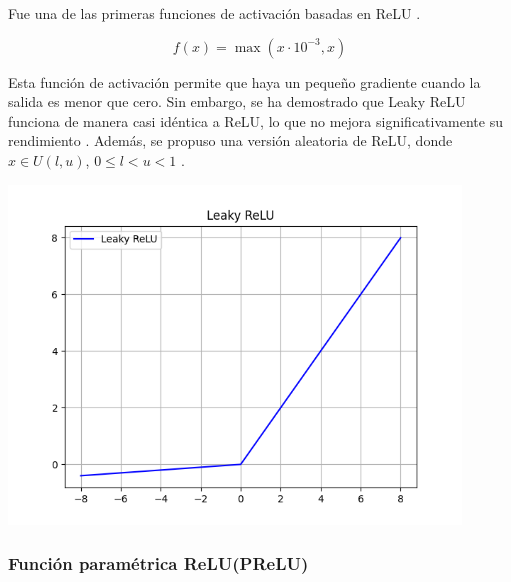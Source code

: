 \begin{minipage}{0.6\textwidth}
    Fue una de las primeras funciones de activación basadas en ReLU \citep{maas2013rectifier}.

\begin{equation}
    f(x) = \max(x\cdot 10^{-3}, x)
\end{equation}

Esta función de activación permite que haya un pequeño gradiente cuando la salida es menor que cero. Sin embargo, se ha demostrado que Leaky ReLU funciona de manera casi idéntica a ReLU, lo que no mejora significativamente su rendimiento \citep{xu2020reluplex}. Además, se propuso una versión aleatoria de ReLU, donde $x \in U(l, u)$, \( 0 \le l < u < 1 \) \citep{apicella2021survey}.
\end{minipage}
\begin{minipage}{0.05\textwidth}
\textbf{ }
\end{minipage}
\begin{minipage}{0.35\textwidth}
    \includegraphics[width=0.9\textwidth]{img/Leaky ReLU.png}
    \label{img: LReLU}
\end{minipage}



\subsubsection*{Función paramétrica ReLU(PReLU)}

